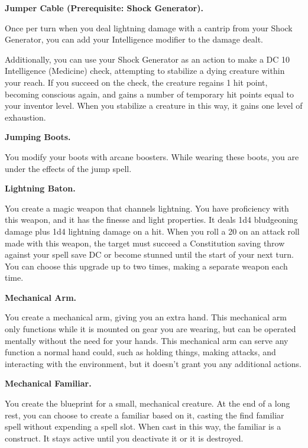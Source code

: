 \documentclass[11pt,twoside,openany]{book}  %
\begin{document}
\begin{fiveitemize}
	\item \textbf{Jumper Cable (Prerequisite: Shock Generator).}
	
	Once per turn when you deal lightning damage with a cantrip from your Shock Generator, you can add your Intelligence modifier to the damage dealt.

	Additionally, you can use your Shock Generator as an action to make a DC 10 Intelligence (Medicine) check, attempting to stabilize a dying creature within your reach. If you succeed on the check, the creature regains 1 hit point, becoming conscious again, and gains a number of temporary hit points equal to your inventor level. When you stabilize a creature in this way, it gains one level of exhaustion.

	\item \textbf{Jumping Boots.}
	
	You modify your boots with arcane boosters. While wearing these boots, you are under the effects of the jump spell.

	\item \textbf{Lightning Baton.}
	
	You create a magic weapon that channels lightning. You have proficiency with this weapon, and it has the finesse and light properties. It deals 1d4 bludgeoning damage plus 1d4 lightning damage on a hit. When you roll a 20 on an attack roll made with this weapon, the target must succeed a Constitution saving throw against your spell save DC or become stunned until the start of your next turn. You can choose this upgrade up to two times, making a separate weapon each time.

	\item \textbf{Mechanical Arm.}
	
	You create a mechanical arm, giving you an extra hand. This mechanical arm only functions while it is mounted on gear you are wearing, but can be operated mentally without the need for your hands. This mechanical arm can serve any function a normal hand could, such as holding things, making attacks, and interacting with the environment, but it doesn’t grant you any additional actions.

	\item \textbf{Mechanical Familiar.}
	
	You create the blueprint for a small, mechanical creature. At the end of a long rest, you can choose to create a familiar based on it, casting the find familiar spell without expending a spell slot. When cast in this way, the familiar is a construct. It stays active until you deactivate it or it is destroyed.


\end{fiveitemize}
\end{document}
